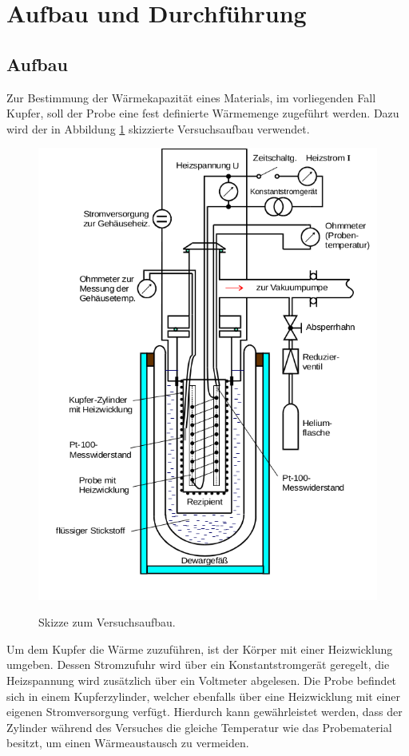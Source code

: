 \section{Aufbau und Durchführung}
\subsection{Aufbau}
\label{sec:Aufbau}

Zur Bestimmung der Wärmekapazität eines Materials, im vorliegenden Fall Kupfer, soll der Probe eine fest definierte Wärmemenge zugeführt werden.
Dazu wird der in Abbildung \ref{fig:aufbau} skizzierte Versuchsaufbau verwendet.

\begin{figure}
  \centering
  \includegraphics{ressources/aufbau.png}
  \caption{Skizze zum Versuchsaufbau.}
  \label{fig:aufbau} \cite{skript}
\end{figure}

Um dem Kupfer die Wärme zuzuführen, ist der Körper mit einer Heizwicklung umgeben.
Dessen Stromzufuhr wird über ein Konstantstromgerät geregelt, die Heizspannung wird zusätzlich über ein Voltmeter abgelesen.
Die Probe befindet sich in einem Kupferzylinder, welcher ebenfalls über eine Heizwicklung mit einer eigenen Stromversorgung verfügt.
Hierdurch kann gewährleistet werden, dass der Zylinder während des Versuches die gleiche Temperatur wie das Probematerial besitzt, um einen Wärmeaustausch zu vermeiden.

